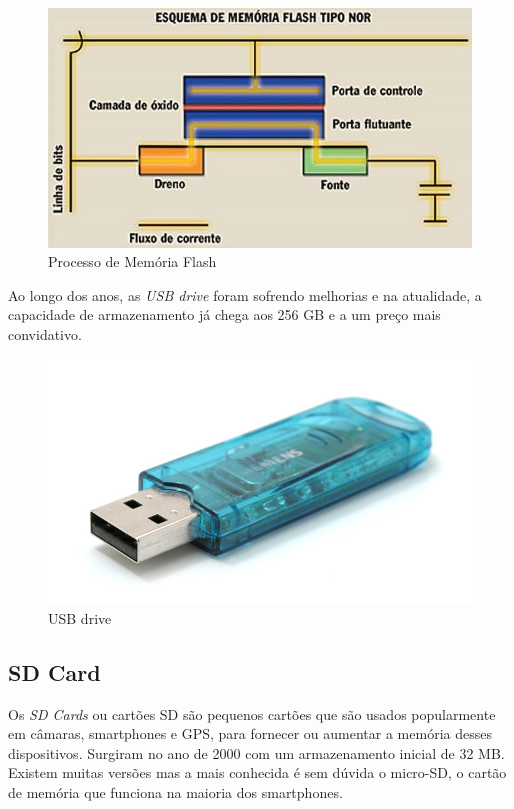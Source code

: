 \documentclass{report}
\begin{document}
	\begin{figure} [h]
		\centering
		\includegraphics[scale=0.4]{flash.jpg}
		\caption{Processo de Memória Flash}
	\end{figure}		 
		
		Ao longo dos anos, as \textit{USB drive} foram sofrendo melhorias e na atualidade, a capacidade de armazenamento já chega aos 256 GB e a um preço mais convidativo.
		
	\begin{figure} [h]
		\centering
		\includegraphics[scale=0.3]{usb_drive.jpg}
		\caption{USB drive}
	\end{figure}		


	
\newpage
		
		\subsection{SD Card}
		
	Os \textit{SD Cards}  ou cartões SD são pequenos cartões que são usados popularmente em câmaras, smartphones e GPS, para fornecer ou aumentar a memória desses dispositivos. Surgiram no ano de 2000 com um armazenamento inicial de 32 MB. Existem muitas versões mas a mais conhecida é sem dúvida o micro-SD, o cartão de memória que funciona na maioria dos smartphones.
\vspace{1mm}
\end{document}
